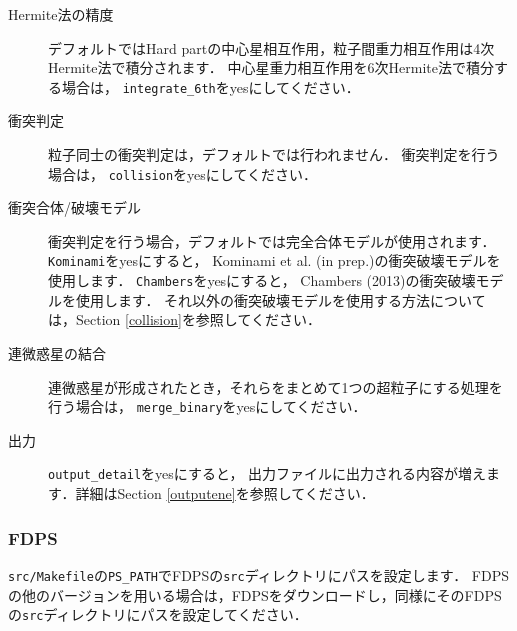 \documentclass[12pt,a4paper,dvipdfmx]{jsarticle}
\begin{document}
\begin{description}
\item[Hermite法の精度]
デフォルトではHard partの中心星相互作用，粒子間重力相互作用は4次Hermite法で積分されます．
中心星重力相互作用を6次Hermite法で積分する場合は，%
\texttt{integrate\_6th}をyesにしてください．

\item[衝突判定]
粒子同士の衝突判定は，デフォルトでは行われません．
衝突判定を行う場合は，%
\texttt{collision}をyesにしてください．

\item[衝突合体/破壊モデル]
衝突判定を行う場合，デフォルトでは完全合体モデルが使用されます．
\texttt{Kominami}をyesにすると，
Kominami et al. (in prep.)の衝突破壊モデルを使用します．
\texttt{Chambers}をyesにすると，
Chambers (2013)の衝突破壊モデルを使用します．
それ以外の衝突破壊モデルを使用する方法については，Section \ref{collision}を参照してください．

\item[連微惑星の結合]
連微惑星が形成されたとき，それらをまとめて1つの超粒子にする処理を行う場合は，
\texttt{merge\_binary}をyesにしてください．


\item[出力]
\texttt{output\_detail}をyesにすると，
出力ファイルに出力される内容が増えます．詳細はSection \ref{outputene}を参照してください．



\end{description}

\subsubsection{FDPS}
\texttt{src/Makefile}の\texttt{PS\_PATH}でFDPSの\texttt{src}ディレクトリにパスを設定します．
FDPSの他のバージョンを用いる場合は，FDPSをダウンロードし，同様にそのFDPSの\texttt{src}ディレクトリにパスを設定してください．
\end{document}
